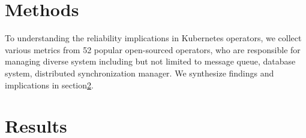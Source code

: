 \section{Methods}
To understanding the reliability implications in Kubernetes operators, we collect various metrics from 52 
    popular open-sourced operators, who are responsible for managing diverse system including but not limited to
    message queue, database system, distributed synchronization manager.
We synthesize findings and implications in section\ref{sec:result}.
\section{Results}
\label{sec:result}